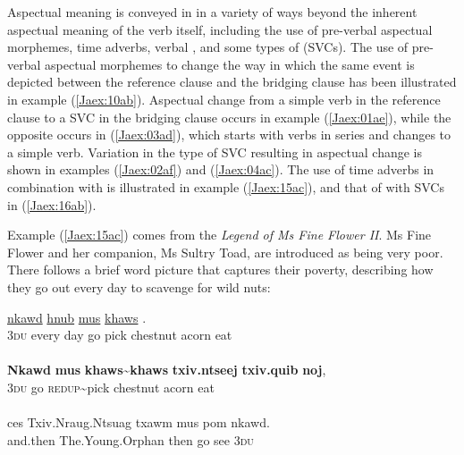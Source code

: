 \documentclass[output=paper]{LSP/langsci}
\begin{document}
Aspectual meaning is conveyed in  in a variety of ways beyond the inherent aspectual meaning of the verb itself, including the use of pre-verbal aspectual morphemes, time adverbs, verbal , and some types of  (SVCs). The use of pre-verbal aspectual morphemes to change the way in which the same event is depicted between the reference clause and the bridging clause has been illustrated in example (\ref{Jaex:10ab}). Aspectual change from a simple verb in the reference clause to a SVC in the bridging clause occurs in example (\ref{Jaex:01ae}), while the opposite occurs in (\ref{Jaex:03ad}), which starts with verbs in series and changes to a simple verb. Variation in the type of SVC resulting in aspectual change is shown in examples (\ref{Jaex:02af}) and (\ref{Jaex:04ac}). The use of time adverbs in combination with  is illustrated in example (\ref{Jaex:15ac}), and that of  with SVCs in (\ref{Jaex:16ab}). 

Example (\ref{Jaex:15ac}) comes from the \textit{Legend of Ms Fine Flower II}. Ms Fine Flower and her companion, Ms Sultry Toad, are introduced as being very poor. There follows a brief word picture that captures their poverty, describing how they go out every day to scavenge for wild nuts:


\begin{exe}
\ex \label{Jaex:15ac}
\begin{xlist}
\ex \label{Jaex:15a}
\gll  \underline{nkawd} \underline{} \underline{hnub} \underline{mus} \underline{khaws} \underline{}     \underline{} \underline{}.\\
 \textsc{3du} every day go pick chestnut  acorn eat\\
\glt {}\\
\ex \label{Jaex:15b}
\gll \textbf{Nkawd} \textbf{mus}  \textbf{khaws{\textasciitilde}khaws} \textbf{txiv.ntseej} \textbf{txiv.quib } \textbf{noj}, \\     	      
     \textsc{3du}  go  \textsc{redup}{\textasciitilde}pick   chestnut  acorn  eat\\
\glt {} \\
\ex \label{Jaex:15c}
\gll ces Txiv.Nraug.Ntsuag txawm mus pom nkawd.\\     	      
     and.then The.Young.Orphan then go see \textsc{3du}\\
\glt {} \citep[][161]{johnson92}
\end{xlist}
\end{exe}
\end{document}
